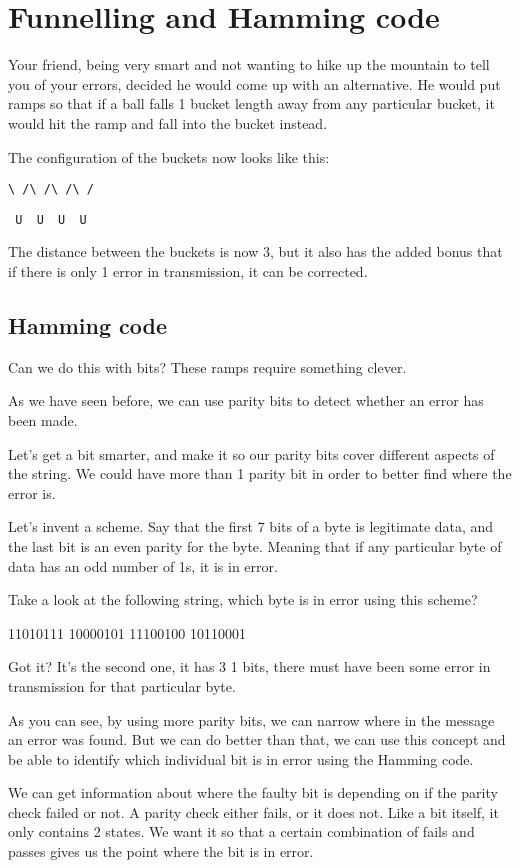 \documentclass{article}
\begin{document}
  \section*{Funnelling and Hamming code}

  Your friend, being very smart and not wanting to hike up the mountain to tell you of your errors, decided he would come up with an alternative. He would put ramps so that if a ball falls 1 bucket length away from any particular bucket, it would hit the ramp and fall into the bucket instead.

  The configuration of the buckets now looks like this:

  \texttt{\textbackslash\ /\textbackslash\ /\textbackslash\ /\textbackslash\ /}

  \texttt{\ U\ \ U\ \ U\ \ U}

  The distance between the buckets is now 3, but it also has the added bonus that if there is only 1 error in transmission, it can be corrected.

  \subsection*{Hamming code}
  Can we do this with bits? These ramps require something clever.

  As we have seen before, we can use parity bits to detect whether an error has been made.

  Let's get a bit smarter, and make it so our parity bits cover different aspects of the string. We could have more than 1 parity bit in order to better find where the error is.

  Let's invent a scheme. Say that the first 7 bits of a byte is legitimate data, and the last bit is an even parity for the byte. Meaning that if any particular byte of data has an odd number of 1s, it is in error.

  Take a look at the following string, which byte is in error using this scheme?

  11010111 10000101 11100100  10110001

  Got it? It's the second one, it has 3 1 bits, there must have been some error in transmission for that particular byte.

  As you can see, by using more parity bits, we can narrow where in the message an error was found. But we can do better than that, we can use this concept and be able to identify which individual bit is in error using the Hamming code.

  We can get information about where the faulty bit is depending on if the parity check failed or not. A parity check either fails, or it does not. Like a bit itself, it only contains 2 states. We want it so that a certain combination of fails and passes gives us the point where the bit is in error.
\end{document}
